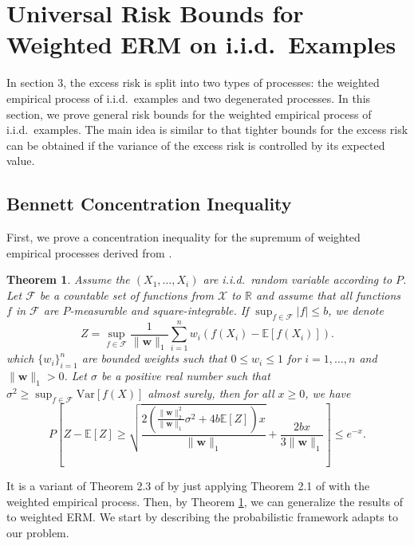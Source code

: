\documentclass[letterpaper]{article} %
\newtheorem{theorem}{Theorem}
\newcommand{\E}{\mathbb{E}}
\newcommand{\Pro}{P}
\newcommand{\Var}{\text{Var}}
\newcommand{\weight}{\mathbf{w}}
\newcommand{\normo}[1]{\|#1\|_1}
\begin{document}
\section{Universal Risk Bounds for Weighted ERM on i.i.d.\ Examples} %
\label{sub:weighted_risk_bounds}

In section 3, the excess risk is split into two types of processes: the weighted empirical process of i.i.d.\ examples and two degenerated processes.
In this section, we prove general risk bounds for the weighted empirical process of i.i.d.\ examples. 
The main idea is similar to \cite{Massart2006} that tighter bounds for the excess risk can be obtained if the variance of the excess risk is controlled by its expected value.

\subsection{Bennett Concentration Inequality} %
\label{subsub:bennett_type_inequality}


First, we prove a concentration inequality for the supremum of weighted empirical processes derived from \cite{Bousquet2002a}.

\begin{theorem}
    \label{th:weighted_bennett_inequality}
    Assume the $(X_1,\dots,X_i)$ are i.i.d.\ random variable according to $P$. Let $\mathcal F$ be a countable set of functions from $\mathcal X$ to $\mathbb R$ and assume that all functions $f$ in $\mathcal F$ are $P$-measurable and square-integrable. If $\sup_{f\in\mathcal F} |f| \le b$, we denote
    \[Z = \sup_{f\in \mathcal F} \frac{1}{\normo{\weight{}}}\sum_{i=1}^n w_i (f(X_i)-\E[f(X_i)]).\]
    which $\{w_i\}_{i=1}^n$ are bounded weights such that $0\le w_i\le 1$ for $i=1,\dots,n$ and $\normo{\weight{}}>0$.
    Let $\sigma$ be a positive real number such that $\sigma^2\ge \sup_{f\in\mathcal F} \Var[f(X)]$ almost surely, then for all $x\ge 0$, we have
    \begin{equation}
        \label{eq:weighted_bennett_inequality}
            \Pro\left[Z-\E[Z] \ge \sqrt{\frac{2(\frac{\|\weight{}\|_2^2}{\normo{\weight{}}}\sigma^2+4b\E[Z])x}{\normo{\weight{}}}} + \frac{2bx}{3\normo{\weight{}}}\right] \le e^{-x}.
    \end{equation}
\end{theorem}

It is a variant of Theorem 2.3 of \cite{Bousquet2002a} by just applying Theorem 2.1 of \cite{Bousquet2002a} with the weighted empirical process.
Then, by Theorem \ref{th:weighted_bennett_inequality}, we can generalize the results of \cite{Massart2006} to weighted ERM. We start by describing the probabilistic framework adapts to our problem.
\end{document}
